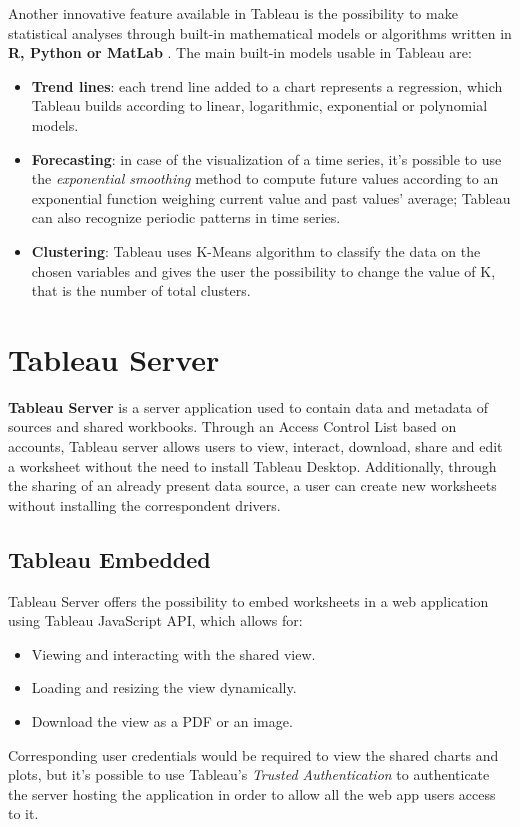 Another innovative feature available in Tableau is the possibility to make statistical analyses through built-in mathematical models  or algorithms written in \textbf{R, Python or MatLab} \cite{LearningTableau}. The main built-in models usable in Tableau are:

\begin{itemize}
    \item \textbf{Trend lines}: each trend line added to a chart represents a regression, which Tableau builds according to linear, logarithmic, exponential or polynomial models.
    \item \textbf{Forecasting}: in case of the visualization of a time series, it's possible to use the \textit{exponential smoothing} method to compute future values according to an exponential function weighing current value and past values' average; Tableau can also recognize periodic patterns in time series.
    \item \textbf{Clustering}: Tableau uses K-Means algorithm to classify the data on the chosen variables and gives the user the possibility to change the value of K, that is the number of total clusters.
\end{itemize}

\section{Tableau Server}

\textbf{Tableau Server} is a server application used to contain data and metadata of sources and shared workbooks. Through an Access Control List based on accounts, Tableau server allows users to view, interact, download, share and edit a worksheet without the need to install Tableau Desktop. Additionally, through the sharing of an already present data source, a user can create new worksheets without installing the correspondent drivers.

\subsection{Tableau Embedded}

Tableau Server offers the possibility to embed worksheets in a web application using Tableau JavaScript API, which allows for:

\begin{itemize}
    \item Viewing and interacting with the shared view.
    \item Loading and resizing the view dynamically.
    \item Download the view as a PDF or an image.
\end{itemize}

Corresponding user credentials would be required to view the shared charts and plots, but it's possible to use Tableau's \textit{Trusted Authentication} to authenticate the server hosting the application in order to allow all the web app users access to it.